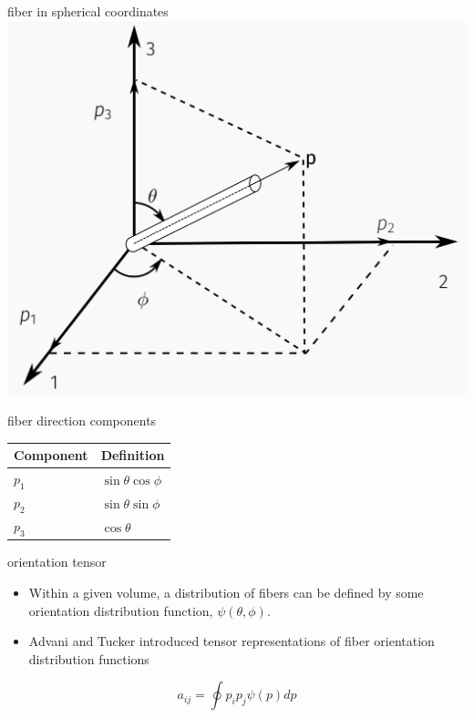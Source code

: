 \documentclass[
  letterpaper,
  ignorenonframetext,
  aspectratio=43,
  handout,
  12pt]{beamer}
\providecommand{\tightlist}{%
  \setlength{\itemsep}{0pt}\setlength{\parskip}{0pt}}
\providecommand{\tightlist}{%
\setlength{\itemsep}{0pt}\setlength{\parskip}{0pt}}
\let\Oldincludegraphics\includegraphics
\renewcommand{\includegraphics}[2][]{\Oldincludegraphics[width=\textwidth,height=0.7\textheight,keepaspectratio]{#2}}
\begin{document}
\begin{frame}{fiber in spherical coordinates}
\protect\hypertarget{fiber-in-spherical-coordinates}{}
\includegraphics{../images/single_fiber.png}
\end{frame}

\begin{frame}{fiber direction components}
\protect\hypertarget{fiber-direction-components}{}
\begin{longtable}[]{@{}ll@{}}
\toprule
Component & Definition \\
\midrule
\endhead
\(p_1\) & \(\sin \theta \cos \phi\) \\
\(p_2\) & \(\sin \theta \sin \phi\) \\
\(p_3\) & \(\cos \theta\) \\
\bottomrule
\end{longtable}
\end{frame}

\begin{frame}{orientation tensor}
\protect\hypertarget{orientation-tensor}{}
\begin{itemize}
\tightlist
\item
  Within a given volume, a distribution of fibers can be defined by some
  orientation distribution function, \(\psi(\theta, \phi)\).
\item
  Advani and Tucker introduced tensor representations of fiber
  orientation distribution functions
\end{itemize}

\[a_{ij} = \oint p_i p_j \psi(p) dp\]
\end{frame}
\end{document}

